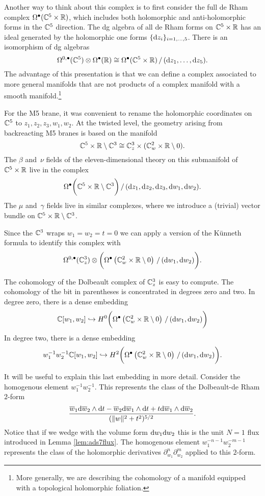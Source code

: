 Another way to think about this complex is to first consider the full de Rham complex $\Omega^\bullet(\mathbb C^5 \times \mathbb R)$, which includes both holomorphic and anti-holomorphic forms in the $\mathbb C^5$ direction. 
The dg algebra of all de Rham forms on $\mathbb C^5 \times \mathbb R$ has an ideal generated by the holomorphic one forms $\{{\rm d} z_i\}_{i=1,\ldots,5}$.
There is an isomorphism of dg algebras
\[
\Omega^{0,\bullet}(\mathbb C^5) \otimes \Omega^\bullet(\mathbb R) \cong \Omega^\bullet(\mathbb C^5 \times \mathbb R) \, / \, ({\rm d} z_1,\ldots, {\rm d} z_5) .
\]
The advantage of this presentation is that we can define a complex associated to more general manifolds that are not products of a complex manifold with a smooth manifold.\footnote{More generally, we are describing the cohomology of a manifold equipped with a topological holomorphic foliation.}

For the M5 brane, it was convenient to rename the holomorphic coordinates on $\mathbb C^5$ to $z_1,z_2,z_3,w_1,w_2$. 
At the twisted level, the geometry arising from backreacting M5 branes is based on the manifold 
\[
\mathbb C^5 \times \mathbb R \setminus \mathbb C^3 \cong \mathbb C_z^3 \times (\mathbb C^2_w \times \mathbb R \setminus 0) .
\]
The $\beta$ and~$\nu$ fields of the eleven-dimensional theory on this submanifold of $\mathbb C^5 \times \mathbb R$ live in the complex 
\[
\Omega^\bullet\bigg(\mathbb C^5 \times \mathbb R \setminus \mathbb C^3\bigg) \, / \, ({\rm d} z_1,{\rm d} z_2,{\rm d} z_3, {\rm d} w_1, {\rm d} w_2)  .
\]
The $\mu$ and~$\gamma$ fields live in similar complexes, where we introduce a (trivial) vector bundle on $\mathbb C^5 \times \mathbb R \setminus \mathbb C^3$. 

Since the $\mathbb C^3$ wraps $w_1=w_2=t=0$ we can apply a version of the K\"unneth formula to identify this complex with 
\[
\Omega^{0,\bullet}(\mathbb C^3_z) \otimes \bigg( \Omega^\bullet\left(\mathbb C^2_w \times \mathbb R \setminus 0 \right) \, / \, ({\rm d} w_1, {\rm d} w_2) \bigg).
\]

The cohomology of the Dolbeault complex of $\mathbb C^3_z$ is easy to compute. 
The cohomology of the bit in parentheses is concentrated in degrees zero and two. 
In degree zero, there is a dense embedding
\[
\mathbb C[w_1,w_2] \hookrightarrow H^0 \bigg( \Omega^\bullet\left(\mathbb C^2_w \times \mathbb R \setminus 0 \right) \, / \, ({\rm d} w_1, {\rm d} w_2) \bigg)
\]
In degree two, there is a dense embedding
\[
w_{1}^{-1} w_2^{-1} \mathbb C[w_1,w_2] \hookrightarrow H^2 \bigg( \Omega^\bullet\left(\mathbb C^2_w \times \mathbb R \setminus 0 \right) \, / \, ({\rm d} w_1, {\rm d} w_2) \bigg).
\]

It will be useful to explain this last embedding in more detail. 
Consider the homogenous element $w_1^{-1} w_2^{-1}$. 
This represents the class of the Dolbeault-de Rham $2$-form
\[
\frac{\overline{w}_1 {\rm d} \overline{w}_2 \wedge {\rm d} t - \overline{w}_2 {\rm d} \overline{w}_1 \wedge {\rm d} t + t {\rm d} \overline{w}_1 \wedge {\rm d} \overline{w}_2}{(\|w\|^2 + t^2)^{5/2}} .
\]
Notice that if we wedge with the volume form ${\rm d} w_1 {\rm d} w_2$ this is the unit $N=1$ flux introduced in Lemma \ref{lem:ads7flux}. 
The homogenous element $w_1^{-n-1} w_2^{-m-1}$ represents the class of the holomorphic derivatives $\partial_{w_1}^n \partial_{w_2}^{m}$ applied to this $2$-form. 

